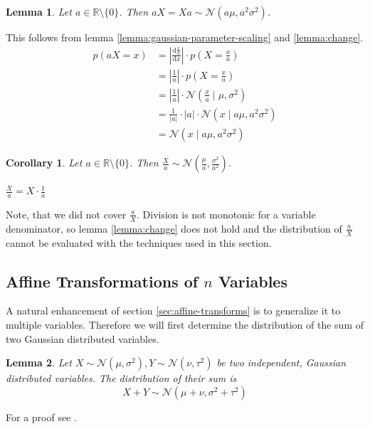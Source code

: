 \documentclass[11pt,a4paper]{book}
\newtheorem{lemma}{Lemma}
\newtheorem*{corollary}{Corollary}
\begin{document}
\begin{lemma}
  Let $a \in \mathbb{R} \setminus \{ 0 \}$. Then
  $aX = Xa \sim \mathcal{N}(a\mu, a^{2}\sigma^{2})$.
\end{lemma}
\begin{proof2}
  This follows from lemma \ref{lemma:gaussian-parameter-scaling} and
  \ref{lemma:change}.
  \begin{align*}
    p(aX = x) & = \left| \frac{\mathrm{d}\frac{x}{a}}{\mathrm{d}x} \right| \cdot p\left( X = \frac{x}{a} \right)\\
              & = \left|\frac{1}{a}\right| \cdot p\left( X = \frac{x}{a} \right)\\
              & = \left|\frac{1}{a}\right| \cdot \mathcal{N}\left(\frac{x}{a} \mid \mu, \sigma^{2}\right)\\
              & = \frac{1}{|a|} \cdot |a| \cdot \mathcal{N}\left(x \mid a\mu, a^{2}\sigma^{2}\right)\\
              & = \mathcal{N}\left(x \mid a\mu, a^{2}\sigma^{2}\right)
  \end{align*}
\end{proof2}

\begin{corollary}
  Let $a \in \mathbb{R} \setminus \{ 0 \}$. Then
  $\frac{X}{a} \sim \mathcal{N}\left( \frac{\mu}{a}, \frac{\sigma^{2}}{a^{2}}
  \right)$.
\end{corollary}
\begin{proof2}
  $\frac{X}{a} = X \cdot \frac{1}{a}$
\end{proof2}

Note, that we did not cover $\frac{a}{X}$. Division is not monotonic for a
variable denominator, so lemma \ref{lemma:change} does not hold and the
distribution of $\frac{a}{X}$ cannot be evaluated with the techniques used in
this section.

\subsection{Affine Transformations of $n$ Variables}

A natural enhancement of section \ref{sec:affine-transforms} is to generalize it
to multiple variables. Therefore we will first determine the distribution of the
sum of two Gaussian distributed variables.

\begin{lemma}
  \label{lemma:gaussian-sum}
  Let $X \sim \mathcal{N}(\mu, \sigma^{2}), Y \sim \mathcal{N}(\nu, \tau^{2})$
  be two independent, Gaussian distributed variables. The distribution of their
  sum is
  \begin{equation*}
    X + Y \sim \mathcal{N}(\mu + \nu, \sigma^{2} + \tau^{2})
  \end{equation*}
\end{lemma}
\begin{proof2}
  For a proof see \cite[Satz~11.9]{krengel}.
\end{proof2}
\end{document}
